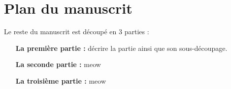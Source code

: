 
\section{Plan du manuscrit}

Le reste du manuscrit est découpé en 3 parties :

\begin{itemize}
\item [\textbf{La première partie :}] décrire la partie ainsi que son sous-découpage.
\item [\textbf{La seconde partie :}] meow
\item [\textbf{La troisième partie :}] meow
\end{itemize}

